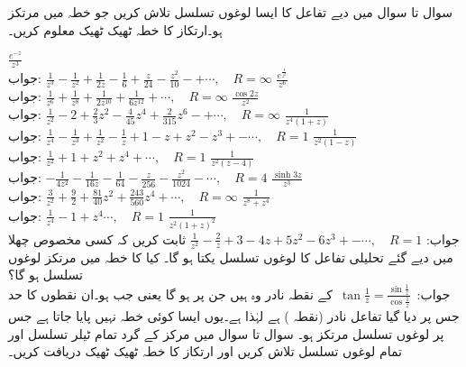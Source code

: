 سوال  تا سوال  میں دیے تفاعل کا ایسا لوغوں تسلسل تلاش کریں جو خطہ  میں مرتکز ہو۔ارتکاز کا خطہ ٹھیک ٹھیک  معلوم کریں۔

\quad
$\tfrac{e^{-z}}{z^3}$\\
جواب:\quad
$\tfrac{1}{z^3}-\tfrac{1}{z^2}+\tfrac{1}{2z}-\tfrac{1}{6}+\tfrac{z}{24}-\tfrac{z^2}{10}-+\cdots,\quad R=\infty$
\quad
$\tfrac{e^{\tfrac{1}{z^2}}}{z^6}$\\
جواب:\quad
$\tfrac{1}{z^6}+\tfrac{1}{z^8}+\tfrac{1}{2z^{10}}+\tfrac{1}{6z^{12}}+\cdots,\quad R=\infty$
\quad
$\tfrac{\cos 2z}{z^2}$\\
جواب:\quad
$\tfrac{1}{z^2}-2+\tfrac{2}{3}z^2-\tfrac{4}{45}z^4+\tfrac{2}{315}z^6-+\cdots,\quad R=\infty$
\quad
$\tfrac{1}{z^4(1+z)}$\\
جواب:\quad
$\tfrac{1}{z^4}-\tfrac{1}{z^3}+\tfrac{1}{z^2}-\tfrac{1}{z}+1-z+z^2-z^3+-\cdots,\quad R=1$
\quad
$\tfrac{1}{z^2(1-z)}$\\
جواب:\quad
$\tfrac{1}{z^2}+1+z^2+z^4+\cdots,\quad R=1$
\quad
$\tfrac{1}{z^2(z-4)}$\\
جواب:\quad
$-\tfrac{1}{4z^2}-\tfrac{1}{16z}-\tfrac{1}{64}-\tfrac{z}{256}-\tfrac{z^2}{1024}-\cdots,\quad R=4$
\quad
$\tfrac{\sinh 3z}{z^3}$\\
جواب:\quad
$\tfrac{3}{z^2}+\tfrac{9}{2}+\tfrac{81}{40}z^2+\tfrac{243}{560}z^4+\cdots,\quad R=\infty$
\quad
$\tfrac{1}{z^8+z^4}$\\
جواب:\quad
$\tfrac{1}{z^4}-1+z^4\cdots,\quad R=1$
\quad
$\tfrac{1}{z^2(1+z)^2}$\\
جواب:\quad
$\tfrac{1}{z^2}-\tfrac{2}{z}+3-4z+5z^2-6z^3+-\cdots,\quad R=1$
\quad
ثابت کریں کہ کسی مخصوص چھلا میں دیے گئے تحلیلی تفاعل کا لوغوں تسلسل یکتا ہو گا۔
\quad
کیا  کا خطہ  میں مرتکز لوغوں تسلسل ہو گا؟\\
جواب:\quad 
$\,\tan \tfrac{1}{z}=\tfrac{\sin \tfrac{1}{z}}{\cos \tfrac{1}{z}}\,$
کے نقطہ نادر وہ ہیں جن پر  ہو گا یعنی جب  ہو۔ان نقطوں  کا حد   جس پر دیا گیا تفاعل نادر (نقطہ ) ہے لہٰذا  ہے۔یوں ایسا کوئی خطہ  نہیں پایا جاتا ہے جس پر لوغوں تسلسل مرتکز ہو۔ 
سوال  تا سوال  میں مرکز  کے گرد تمام ٹیلر تسلسل اور تمام لوغوں تسلسل تلاش کریں اور ارتکاز کا خطہ ٹھیک ٹھیک دریافت کریں۔

